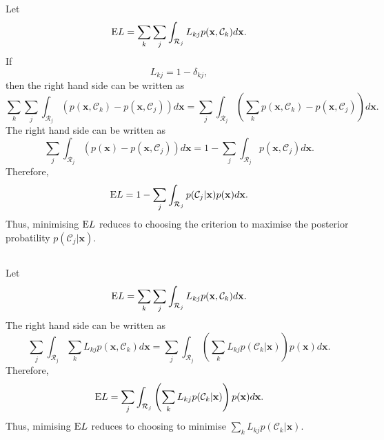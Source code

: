 \subsection{}
\label{1.22}
Let
%
\begin{equation}
{\rm E} L = \sum_{k} \sum_{j} \int_{\mathcal{R}_j} L_{kj} p(\mathbf{x}, \mathcal{C}_k) d\mathbf{x}.
\end{equation}
%
If
%
\begin{equation}
L_{kj} = 1 - \delta_{kj},
\end{equation}
%
then the right hand side can be written as
%
\begin{equation}
\sum_{k} \sum_{j} \int_{\mathcal{R}_j} \left( p(\mathbf{x}, \mathcal{C}_k) - p(\mathbf{x}, \mathcal{C}_j) \right)  d\mathbf{x} = \sum_{j} \int_{\mathcal{R}_j} \left( \sum_{k} p(\mathbf{x}, \mathcal{C}_k) - p(\mathbf{x}, \mathcal{C}_j) \right)  d\mathbf{x}.
\end{equation}
%
The right hand side can be written as
%
\begin{equation}
\sum_{j} \int_{\mathcal{R}_j} \left( p(\mathbf{x}) - p(\mathbf{x}, \mathcal{C}_j) \right)  d\mathbf{x} = 1 - \sum_{j} \int_{\mathcal{R}_j} p(\mathbf{x}, \mathcal{C}_j) d\mathbf{x}.
\end{equation}
%
Therefore,
%
\begin{equation}
{\rm E} L = 1 - \sum_{j} \int_{\mathcal{R}_j} p(\mathcal{C}_j | \mathbf{x}) p(\mathbf{x}) d\mathbf{x}.
\end{equation}
%
Thus, minimising ${\rm E} L$ reduces to choosing the criterion to maximise the posterior probatility $p(\mathcal{C}_j | \mathbf{x})$.


\subsection{}
\label{1.23}
Let
%
\begin{equation}
{\rm E} L = \sum_{k} \sum_{j} \int_{\mathcal{R}_j} L_{kj} p(\mathbf{x}, \mathcal{C}_k) d\mathbf{x}.
\end{equation}
%
The right hand side can be written as
%
\begin{equation}
\sum_{j} \int_{\mathcal{R}_j} \sum_{k} L_{kj} p(\mathbf{x}, \mathcal{C}_k) d\mathbf{x} = \sum_{j} \int_{\mathcal{R}_j} \left( \sum_{k} L_{kj} p(\mathcal{C}_k | \mathbf{x}) \right) p(\mathbf{x}) d\mathbf{x}.
\end{equation}
%
Therefore,
%
\begin{equation}
{\rm E} L = \sum_{j} \int_{\mathcal{R}_j} \left( \sum_{k} L_{kj} p(\mathcal{C}_k | \mathbf{x}) \right) p(\mathbf{x}) d\mathbf{x}.
\end{equation}
%
Thus, mimising ${\rm E} L$ reduces to choosing to minimise $\sum_{k} L_{kj} p(\mathcal{C}_k | \mathbf{x})$.


